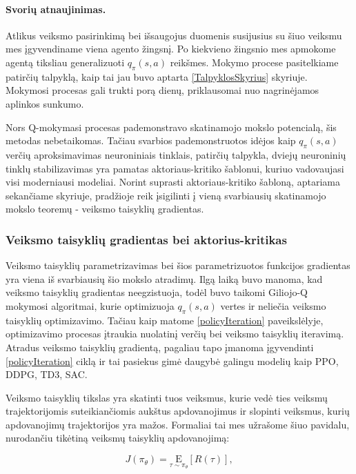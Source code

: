 \documentclass[a4paper, 12pt]{article}
\begin{document}
\paragraph{Svorių atnaujinimas.}

Atlikus veiksmo pasirinkimą bei išsaugojus duomenis susijusius su šiuo veiksmu mes įgyvendiname viena agento žingsnį. Po kiekvieno žingsnio mes apmokome agentą tiksliau generalizuoti $q_{\pi}(s, a)$ reikšmes. Mokymo procese pasitelkiame patirčių talpyklą, kaip tai jau buvo aptarta \ref{TalpyklosSkyrius} skyriuje. Mokymosi procesas gali trukti porą dienų, priklausomai nuo nagrinėjamos aplinkos sunkumo.

Nors Q-mokymasi procesas pademonstravo skatinamojo mokslo potencialą, šis metodas nebetaikomas. Tačiau svarbios pademonstruotos idėjos kaip  $q_{\pi}(s, a)$ verčių aproksimavimas neuroniniais tinklais, patirčių talpykla, dviejų neuroninių tinklų stabilizavimas yra pamatas aktoriaus-kritiko šablonui, kuriuo vadovaujasi visi moderniausi modeliai. Norint suprasti aktoriaus-kritiko šabloną, aptariama sekančiame skyriuje, pradžioje reik įsigilinti į vieną svarbiausių skatinamojo mokslo teoremų - veiksmo taisyklių gradientas.


\subsubsection{Veiksmo taisyklių gradientas bei aktorius-kritikas}

Veiksmo taisyklių parametrizavimas bei šios parametrizuotos funkcijos gradientas yra viena iš svarbiausių šio mokslo atradimų. Ilgą laiką buvo manoma, kad veiksmo taisyklių gradientas neegzistuoja, todėl buvo taikomi Giliojo-Q mokymosi algoritmai, kurie optimizuoja $q_{\pi}(s, a)$ vertes ir neliečia veiksmo taisyklių optimizavimo. Tačiau kaip matome \ref{policyIteration} paveikslėlyje, optimizavimo procesas įtraukia nuolatinį verčių bei veiksmo taisyklių iteravimą. Atradus veiksmo taisyklių gradientą, pagaliau tapo įmanoma įgyvendinti \ref{policyIteration} ciklą ir tai pasiekus gimė daugybė galingu modelių kaip PPO, DDPG, TD3, SAC. 

Veiksmo taisyklių tikslas yra skatinti tuos veiksmus, kurie vedė ties veiksmų trajektorijomis suteikiančiomis aukštus apdovanojimus ir slopinti veiksmus, kurių apdovanojimų trajektorijos yra mažos. Formaliai tai mes užrašome šiuo pavidalu, nurodančiu tikėtiną veiksmų taisyklių apdovanojimą:

\begin{equation}
J\left(\pi_{\theta}\right)=\underset{\tau \sim \pi_{\theta}}{\mathrm{E}}[R(\tau)],
\end{equation}
\end{document}
